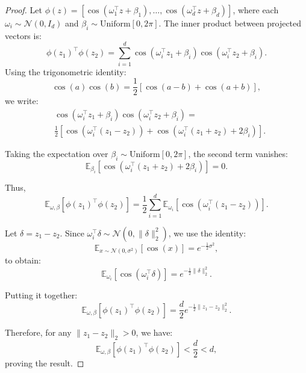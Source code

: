 \documentclass{article}
\newtheorem{proof}{Proof}
\begin{document}
\normalsize


\clearpage
\newpage
\appendix

\begin{proof}
Let $\phi(z) = \left[ \cos(\omega_1^\top z + \beta_1), \dots, \cos(\omega_d^\top z + \beta_d) \right]$, where each $\omega_i \sim \mathcal{N}(0, I_d)$ and $\beta_i \sim \mathrm{Uniform}[0, 2\pi]$. The inner product between projected vectors is:
\[
\phi(z_1)^\top \phi(z_2) = \sum_{i=1}^d \cos(\omega_i^\top z_1 + \beta_i) \cos(\omega_i^\top z_2 + \beta_i).
\]
Using the trigonometric identity:
\[
\cos(a)\cos(b) = \frac{1}{2}[\cos(a - b) + \cos(a + b)],
\]
we write:
\begin{align*}
    &\cos(\omega_i^\top z_1 + \beta_i) \cos(\omega_i^\top z_2 + \beta_i) = \\
&\frac{1}{2} \left[ \cos(\omega_i^\top(z_1 - z_2)) + \cos(\omega_i^\top(z_1 + z_2) + 2\beta_i) \right].    
\end{align*}


Taking the expectation over $\beta_i \sim \mathrm{Uniform}[0, 2\pi]$, the second term vanishes:
\[
\mathbb{E}_{\beta_i}[\cos(\omega_i^\top(z_1 + z_2) + 2\beta_i)] = 0.
\]

Thus,
\[
\mathbb{E}_{\omega, \beta}[\phi(z_1)^\top \phi(z_2)] = \frac{1}{2} \sum_{i=1}^d \mathbb{E}_{\omega_i}[\cos(\omega_i^\top(z_1 - z_2))].
\]

Let $\delta = z_1 - z_2$. Since $\omega_i^\top \delta \sim \mathcal{N}(0, \|\delta\|_2^2)$, we use the identity:
\[
\mathbb{E}_{x \sim \mathcal{N}(0, \sigma^2)}[\cos(x)] = e^{-\frac{1}{2}\sigma^2},
\]
to obtain:
\[
\mathbb{E}_{\omega_i}[\cos(\omega_i^\top \delta)] = e^{-\frac{1}{2}\|\delta\|_2^2}.
\]

Putting it together:
\[
\mathbb{E}_{\omega, \beta}[\phi(z_1)^\top \phi(z_2)] = \frac{d}{2} e^{-\frac{1}{2}\|z_1 - z_2\|_2^2}.
\]

Therefore, for any $\|z_1 - z_2\|_2 > 0$, we have:
\[
\mathbb{E}_{\omega, \beta}[\phi(z_1)^\top \phi(z_2)] < \frac{d}{2} < d,
\]
proving the result.
\end{proof}

\clearpage
\newpage
\end{document}
